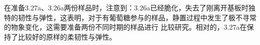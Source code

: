 在准备3.27a、3.26a两份样品时，注意到：3.26a已经脆化，失去了刚离开基板时独特的韧性与弹性，这表明，对于有葡萄糖参与的样品，静置过程中发生了极不寻常的物象变化，这需要准备两份不同时期的样品进行
比较研究。相对的，3.27a在保持了比较好的原样的柔韧性与弹性。
